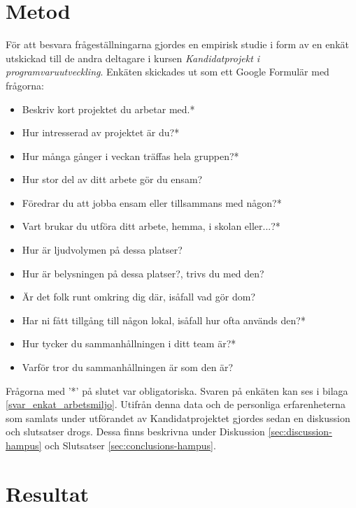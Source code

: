 \section{Metod}
\label{sec:method-hampus}

För att besvara frågeställningarna gjordes en empirisk studie i form av en enkät utskickad till de andra deltagare i kursen \textit{Kandidatprojekt i programvaruutveckling}. Enkäten skickades ut som ett Google Formulär\cite{GForms} med frågorna:
\begin{itemize}
\item Beskriv kort projektet du arbetar med.*
\item Hur intresserad av projektet är du?*
\item Hur många gånger i veckan träffas hela gruppen?*
\item Hur stor del av ditt arbete gör du ensam?
\item Föredrar du att jobba ensam eller tillsammans med någon?*
\item Vart brukar du utföra ditt arbete, hemma, i skolan eller...?*
\item Hur är ljudvolymen på dessa platser?
\item Hur är belysningen på dessa platser?, trivs du med den?
\item Är det folk runt omkring dig där, isåfall vad gör dom?
\item Har ni fått tillgång till någon lokal, isåfall hur ofta används den?*
\item Hur tycker du sammanhållningen i ditt team är?*
\item Varför tror du sammanhållningen är som den är?
\end{itemize}
Frågorna med '*' på slutet var obligatoriska. Svaren på enkäten kan ses i bilaga \ref{svar_enkat_arbetsmiljo}. Utifrån denna data och de personliga erfarenheterna som samlats under utförandet av Kandidatprojektet gjordes sedan en diskussion och slutsatser drogs. Dessa finns beskrivna under Diskussion \ref{sec:discussion-hampus} och Slutsatser \ref{sec:conclusions-hampus}. 

\section{Resultat}
\label{sec:results-hampus}

